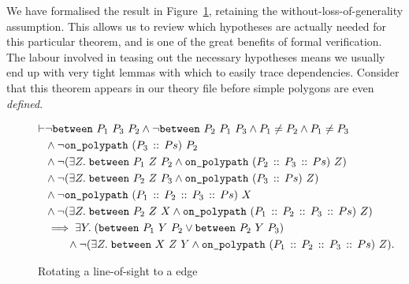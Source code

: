 We have formalised the result in Figure~\ref{fig:RotateToEdge}, retaining the without-loss-of-generality assumption. This allows us to review which hypotheses are actually needed for this particular theorem, and is one of the great benefits of formal verification. The labour involved in teasing out the necessary hypotheses means we usually end up with very tight lemmas with which to easily trace dependencies. Consider that this theorem appears in our theory file before simple polygons are even \emph{defined}.

\begin{figure}
\begin{equation}\label{eq:RotateToEdge}
  \begin{split}
\vdash&\neg\texttt{between}\ P_1\ P_3\ P_2 \wedge \neg\texttt{between}\ P_2\ P_1\ P_3 \wedge P_1 \neq P_2 \wedge P_1 \neq P_3\\
    &\wedge\neg\texttt{on\_polypath}\ (P_3\,::\,Ps)\ P_2\\
    &\wedge\neg(\exists Z.\; \texttt{between}\ P_1\ Z\ P_2 \wedge \texttt{on\_polypath}\ (P_2\,::\,P_3\,::\,Ps)\ Z)\\
    &\wedge\neg(\exists Z.\; \texttt{between}\ P_2\ Z\ P_3 \wedge \texttt{on\_polypath}\ (P_3\,::\,Ps)\ Z)\\
    &\wedge\neg\texttt{on\_polypath}\ (P_1\,::\,P_2\,::\,P_3\,::\,Ps)\ X\\
    &\wedge\neg(\exists Z.\; \texttt{between}\ P_2\ Z\ X \wedge \texttt{on\_polypath}\ (P_1\,::\,P_2\,::\,P_3\,::\,Ps)\ Z)\\
    &\implies\exists Y.\; (\texttt{between}\ P_1\ Y\ P_2 \vee \texttt{between}\ P_2\ Y\ P_3)\\
    &\qquad \wedge \neg(\exists Z.\; \texttt{between}\ X\ Z\ Y \wedge \texttt{on\_polypath}\ (P_1\,::\,P_2\,::\,P_3\,::\,Ps)\ Z).
  \end{split}
\end{equation}
\caption{Rotating a line-of-sight to a edge}
\label{fig:RotateToEdge}
\end{figure}

